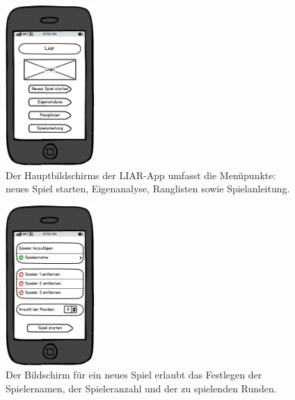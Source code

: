 \documentclass[10pt, a4paper, oneside, titlepage]{scrartcl} %
\begin{document}
	\begin{figure}[ht!]
		\begin{center}
			\includegraphics[width=0.3\textwidth]{mockup_01_index.png}
		\end{center}
		\caption[Mockup Hauptbildschirm]{Der Hauptbildschirms der LIAR-App umfasst die Menüpunkte: neues Spiel starten, Eigenanalyse, Ranglisten sowie Spielanleitung. }
		\label{fig:mockup_01}
	\end{figure}	
	\begin{figure}[h!]
		\begin{center}
			\includegraphics[width=0.3\textwidth]{mockup_02_newgame.png}
		\end{center}
		\caption[Mockup Bildschirm für neues Spiel]{Der Bildschirm für ein neues Spiel erlaubt das Festlegen der Spielernamen, der Spieleranzahl und der zu spielenden Runden.}
		\label{fig:mockup_02}
	\end{figure}	
\end{document}
